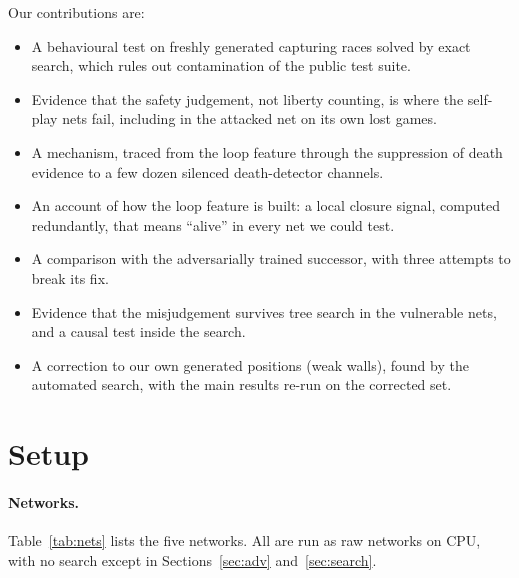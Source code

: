 \documentclass[11pt]{article}
\begin{document}
Our contributions are:
\begin{itemize}
\item A behavioural test on freshly generated capturing races solved by exact search, which rules out contamination of the public test suite.
\item Evidence that the safety judgement, not liberty counting, is where the self-play nets fail, including in the attacked net on its own lost games.
\item A mechanism, traced from the loop feature through the suppression of death evidence to a few dozen silenced death-detector channels.
\item An account of how the loop feature is built: a local closure signal, computed redundantly, that means ``alive'' in every net we could test.
\item A comparison with the adversarially trained successor, with three attempts to break its fix.
\item Evidence that the misjudgement survives tree search in the vulnerable nets, and a causal test inside the search.
\item A correction to our own generated positions (weak walls), found by the automated search, with the main results re-run on the corrected set.
\end{itemize}

\section{Setup}
\label{sec:setup}

\paragraph{Networks.} Table~\ref{tab:nets} lists the five networks. All are run as raw networks on CPU, with no search except in Sections~\ref{sec:adv} and~\ref{sec:search}.
\end{document}
